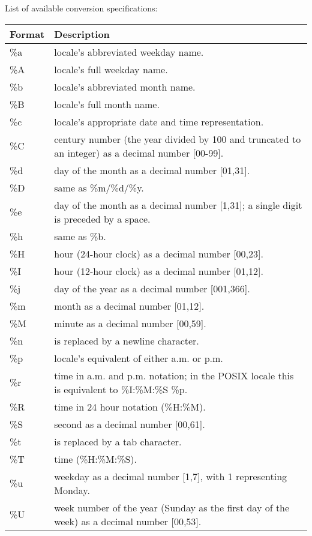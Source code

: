 \bigskip 
\noindent List of available conversion specifications:
\begin{center}
\begin{tabularx}{\linewidth}{lX}
\rowcolor{gray!30}\textbf{Format} & \textbf{Description} \\\hline
\%a & locale's abbreviated weekday name. \\
\%A & locale's full weekday name. \\
\%b & locale's abbreviated month name. \\
\%B & locale's full month name. \\
\%c & locale's appropriate date and time representation. \\
\%C & century number (the year divided by 100 and truncated to an integer) as a decimal number [00-99]. \\
\%d & day of the month as a decimal number [01,31]. \\
\%D & same as \%m/\%d/\%y. \\
\%e & day of the month as a decimal number [1,31]; a single digit is preceded by a space. \\
\%h & same as \%b. \\
\%H & hour (24-hour clock) as a decimal number [00,23]. \\
\%I & hour (12-hour clock) as a decimal number [01,12]. \\
\%j & day of the year as a decimal number [001,366]. \\
\%m & month as a decimal number [01,12]. \\
\%M & minute as a decimal number [00,59]. \\
\%n & is replaced by a newline character. \\
\%p & locale's equivalent of either a.m. or p.m. \\
\%r & time in a.m. and p.m. notation; in the POSIX locale this is equivalent to \%I:\%M:\%S \%p. \\
\%R & time in 24 hour notation (\%H:\%M). \\
\%S & second as a decimal number [00,61]. \\
\%t & is replaced by a tab character. \\
\%T & time (\%H:\%M:\%S). \\
\%u & weekday as a decimal number [1,7], with 1 representing Monday. \\
\%U & week number of the year (Sunday as the first day of the week) as a decimal number [00,53]. \\

\end{tabularx}
\end{center}
